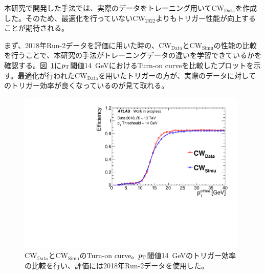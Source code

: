 本研究で開発した手法では、実際のデータをトレーニング用いて$\mathrm{CW_{Data}}$を作成した。そのため、最適化を行っていない$\mathrm{CW_{2022}}$よりもトリガー性能が向上することが期待される。


まず、2018年Run-2データを評価に用いた時の、$\mathrm{CW_{Data}}$と$\mathrm{CW_{Simu}}$の性能の比較を行うことで、本研究の手法がトレーニングデータの違いを学習できているかを確認する。図~\ref{fig:v06v07}に$p_{\rm{T}}$閾値14~GeVにおけるTurn-on curveを比較したプロットを示す。最適化が行われた$\mathrm{CW_{Data}}$を用いたトリガーの方が、実際のデータに対してのトリガー効率が良くなっているのが見て取れる。
\begin{figure}[tb]
  \centering
  \includegraphics[clip, width=11cm]{fig/5/v06vsv07_MU14_re.pdf}
  \caption{$\mathrm{CW_{Data}}$と$\mathrm{CW_{Simu}}$のTurn-on curve。$p_{\rm{T}}$閾値14~GeVのトリガー効率の比較を行い、評価には2018年Run-2データを使用した。}
  \label{fig:v06v07}
\end{figure}


